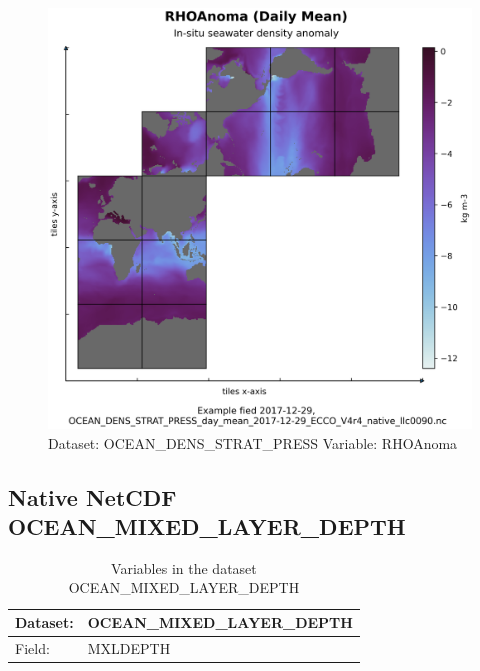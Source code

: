 \begin{figure}[H]
\centering
\includegraphics[scale=0.55]{../images/plots/native_plots/Ocean_Density_Stratification_and_Hydrostatic_Pressure/RHOAnoma.png}
\caption{Dataset: OCEAN\_DENS\_STRAT\_PRESS Variable: RHOAnoma}
\label{tab:table-OCEAN_DENS_STRAT_PRESS_RHOAnoma-Plot}
\end{figure}
\pagebreak
\subsection{Native NetCDF OCEAN\_MIXED\_LAYER\_DEPTH}
\newp
\begin{longtable}{|p{}|p{}|}
\caption{Variables in the dataset OCEAN\_MIXED\_LAYER\_DEPTH}
\label{tab:table-OCEAN_MIXED_LAYER_DEPTH-fields} \\ 
\hline \endhead \hline \endfoot
\rowcolor{lightgray} \textbf{Dataset:} & \textbf{OCEAN\_MIXED\_LAYER\_DEPTH} \\ \hline
Field: &MXLDEPTH \\ \hline
\end{longtable}

\pagebreak
